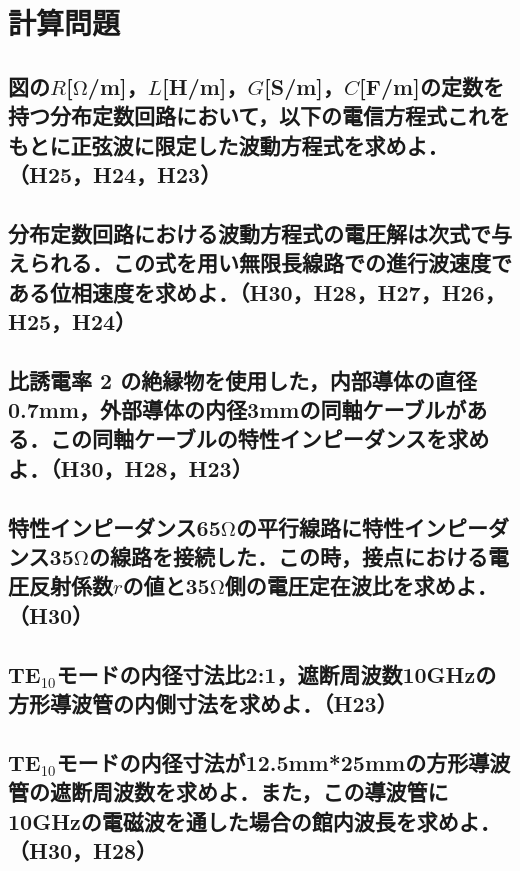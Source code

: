\newpage
\section{計算問題}
\subsection{図の$R$[$\mathrm{\Omega}$/m]，$L$[H/m]，$G$[S/m]，$C$[F/m]の定数を持つ分布定数回路において，以下の電信方程式これをもとに正弦波に限定した波動方程式を求めよ．（H25，H24，H23）}
\vspace{7cm}

\subsection{分布定数回路における波動方程式の電圧解は次式で与えられる．この式を用い無限長線路での進行波速度である位相速度を求めよ．（H30，H28，H27，H26，H25，H24）}
\vspace{7cm}

\subsection{比誘電率 2 の絶縁物を使用した，内部導体の直径0.7mm，外部導体の内径3mmの同軸ケーブルがある．この同軸ケーブルの特性インピーダンスを求めよ．（H30，H28，H23）}
\vspace{7cm}

\newpage
\subsection{特性インピーダンス65$\mathrm{\Omega}$の平行線路に特性インピーダンス35$\mathrm{\Omega}$の線路を接続した．この時，接点における電圧反射係数$r$の値と35$\mathrm{\Omega}$側の電圧定在波比を求めよ．（H30）}
\vspace{7cm}

\subsection{TE$_10$モードの内径寸法比2:1，遮断周波数10GHzの方形導波管の内側寸法を求めよ．（H23）}
\vspace{7cm}

\subsection{TE$_10$モードの内径寸法が12.5mm*25mmの方形導波管の遮断周波数を求めよ．また，この導波管に10GHzの電磁波を通した場合の館内波長を求めよ．（H30，H28）}
\vspace{7cm}

